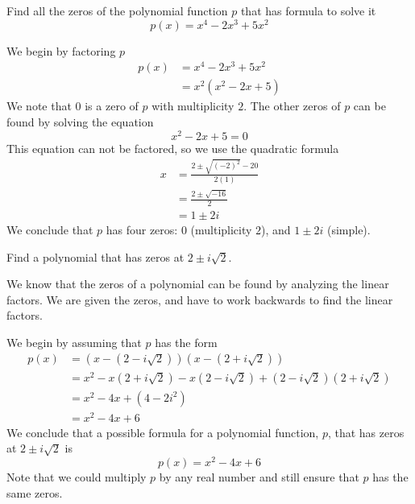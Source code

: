 \begin{pccexample}
	Find all the zeros of the polynomial function $p$ that has formula to solve it
	\[
		p(x)=x^4-2x^3+5x^2
	\]
	\begin{pccsolution}
		We begin by factoring $p$
		\begin{align*}
			p(x) & =x^4-2x^3+5x^2 \\ 
			     & =x^2(x^2-2x+5) 
		\end{align*}
		We note that $0$ is a zero of $p$ with multiplicity $2$. The other zeros of $p$ 
		can be found by solving the equation
		\[
			x^2-2x+5=0
		\]
		This equation can not be factored, so we use the quadratic formula
		\begin{align*}
			x & =\frac{2\pm\sqrt{(-2)^2}-20}{2(1)} \\ 
			  & =\frac{2\pm\sqrt{-16}}{2}          \\          
			  & =1\pm 2i                           
		\end{align*}
		We conclude that $p$ has four zeros: $0$ (multiplicity $2$), and $1\pm 2i$ (simple).
	\end{pccsolution}
\end{pccexample}
\begin{pccexample}
	Find a polynomial that has zeros at $2\pm i\sqrt{2}$. 
	\begin{pccsolution}
		We know that the zeros of a polynomial can be found by analyzing the linear
		factors. We are given the zeros, and have to work backwards to find the 
		linear factors. 
		
		We begin by assuming that $p$ has the form
		\begin{align*}
			p(x) & =(x-(2-i\sqrt{2}))(x-(2+i\sqrt{2}))                           \\                           
			     & =x^2-x(2+i\sqrt{2})-x(2-i\sqrt{2})+(2-i\sqrt{2})(2+i\sqrt{2}) \\ 
			     & =x^2-4x+(4-2i^2)                                              \\                                              
			     & =x^2-4x+6                                                     
		\end{align*}
		We conclude that a possible formula for a polynomial function, $p$, 
		that has zeros at $2\pm i\sqrt{2}$ is
		\[
			p(x)=x^2-4x+6
		\]
		Note that we could multiply $p$ by any real number and still ensure
		that $p$ has the same zeros.
	\end{pccsolution}
\end{pccexample}
